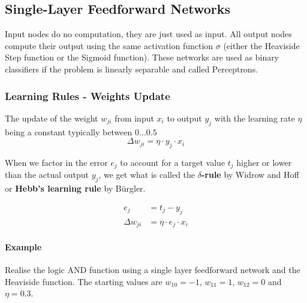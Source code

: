 \documentclass[11pt]{article}
\begin{document}
\subsection{Single-Layer Feedforward Networks}
Input nodes do no computation, they are just used as input. All output nodes compute their output using the same activation function $\sigma$ (either the Heaviside Step function or the Sigmoid function). These networks are used as binary classifiers if the problem is linearly separable and called Perceptrons.

\subsubsection{Learning Rules - Weights Update}

The update of the weight $w_{ji}$ from input $x_i$ to output $y_j$ with the learning rate $\eta$ being a constant typically between $0 ... 0.5$
\begin{equation}
    \Delta w_{ji} = \eta\cdot y_j \cdot x_i
\end{equation}

When we factor in the error $e_j$ to account for a target value $t_j$ higher or lower than the actual output $y_j$, we get what is called the \textbf{$\delta$-rule} by Widrow and Hoff or \textbf{Hebb's learning rule} by Bürgler.

\begin{align}\label{eq:widrowhoffrule}
    e_j &= t_j - y_j\\
    \Delta w_{ji} &= \eta\cdot e_j \cdot x_i
\end{align}

\paragraph{Example} Realise the logic AND function using a single layer feedforward network and the Heaviside function. The starting values are $w_{10}=-1$, $w_{11}=1$, $w_{12}=0$ and $\eta=0.3$.
\end{document}
